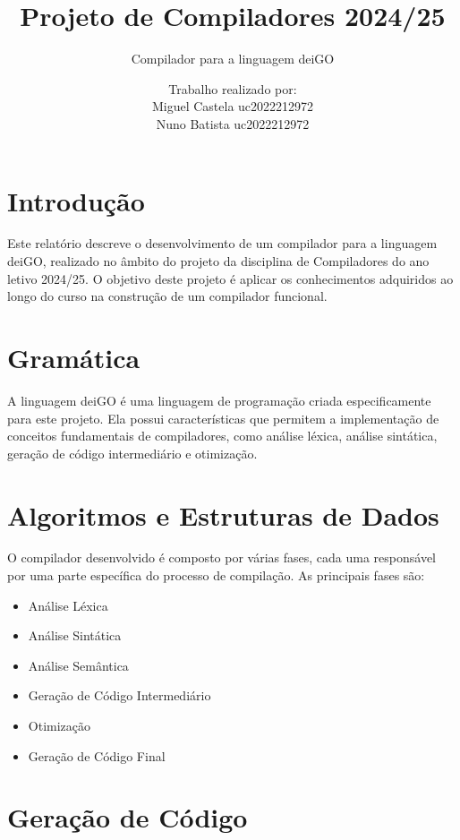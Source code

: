\documentclass[12pt]{article}
\title{Projeto de Compiladores 2024/25}
\subtitle{Compilador para a linguagem deiGO}
\author{Trabalho realizado por:\\
Miguel Castela uc2022212972 \\
Nuno Batista uc2022212972}
\date{}
\begin{document}
\maketitle

\newpage

\section{Introdução}
Este relatório descreve o desenvolvimento de um compilador para a linguagem deiGO, realizado no âmbito do projeto da disciplina de Compiladores do ano letivo 2024/25. O objetivo deste projeto é aplicar os conhecimentos adquiridos ao longo do curso na construção de um compilador funcional.

\section{Gramática}
A linguagem deiGO é uma linguagem de programação criada especificamente para este projeto. Ela possui características que permitem a implementação de conceitos fundamentais de compiladores, como análise léxica, análise sintática, geração de código intermediário e otimização.

\section{Algoritmos e Estruturas de Dados}
O compilador desenvolvido é composto por várias fases, cada uma responsável por uma parte específica do processo de compilação. As principais fases são:

\begin{itemize}
    \item Análise Léxica
    \item Análise Sintática
    \item Análise Semântica
    \item Geração de Código Intermediário
    \item Otimização
    \item Geração de Código Final
\end{itemize}

\section{Geração de Código}
\end{document}
